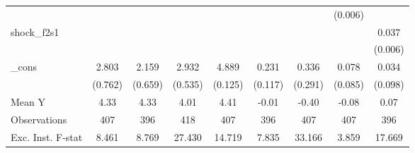 {\begin{tabular}{l*{8}{c}}
            &                     &                     &                     &                     &                     &                     &     (0.006)         &                     \\
\addlinespace
shock\_f2s1  &                     &                     &                     &                     &                     &                     &                     &       0.037\sym{***}\\
            &                     &                     &                     &                     &                     &                     &                     &     (0.006)         \\
\addlinespace
\_cons      &       2.803\sym{***}&       2.159\sym{***}&       2.932\sym{***}&       4.889\sym{***}&       0.231\sym{*}  &       0.336         &       0.078         &       0.034         \\
            &     (0.762)         &     (0.659)         &     (0.535)         &     (0.125)         &     (0.117)         &     (0.291)         &     (0.085)         &     (0.098)         \\
\midrule
Mean Y      &        4.33         &        4.33         &        4.01         &        4.41         &       -0.01         &       -0.40         &       -0.08         &        0.07         \\
Observations&         407         &         396         &         418         &         407         &         396         &         407         &         407         &         396         \\
Exc. Inst. F-stat&       8.461         &       8.769         &      27.430         &      14.719         &       7.835         &      33.166         &       3.859         &      17.669         \\
\bottomrule
\end{tabular}
}
